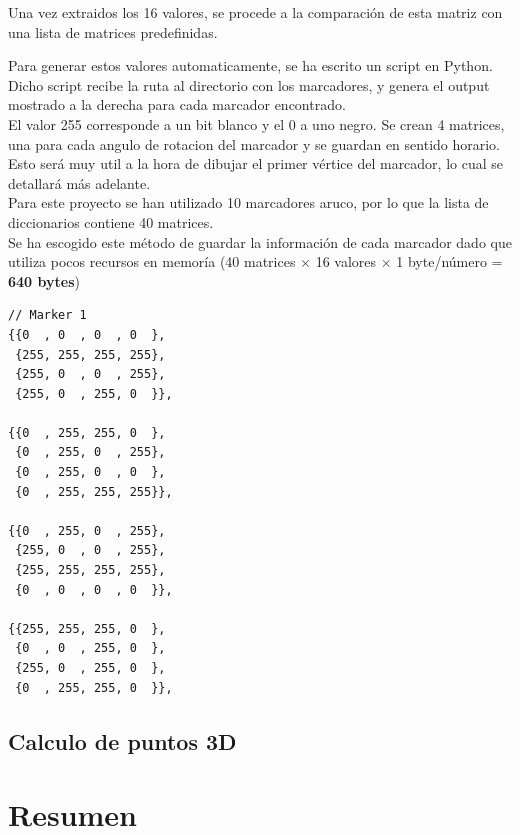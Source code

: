 \documentclass{article}
\begin{document}
Una vez extraidos los 16 valores, se procede a la comparación de esta matriz con una lista de matrices predefinidas.

\noindent
\begin{minipage}{0.6\textwidth}
  Para generar estos valores automaticamente, se ha escrito un script en Python.\\ Dicho script recibe la ruta al directorio con los marcadores, y genera el output mostrado a la derecha para cada marcador encontrado.\\

  El valor 255 corresponde a un bit blanco y el 0 a uno negro. Se crean 4 matrices, una para cada angulo de rotacion del marcador y se guardan en sentido horario. Esto será muy util a la hora de dibujar el primer vértice del marcador, lo cual se detallará más adelante.\\
  Para este proyecto se han utilizado 10 marcadores aruco, por lo que la lista de diccionarios contiene 40 matrices.\\

  Se ha escogido este método de guardar la información de cada marcador dado que utiliza pocos recursos en memoría (40 matrices $\times$ 16 valores $\times$ 1 byte/número = \textbf{640 bytes})
\end{minipage}%
\hfill
\begin{minipage}{0.35\textwidth}
\begin{center}
\begin{BVerbatim}
// Marker 1
{{0  , 0  , 0  , 0  }, 
 {255, 255, 255, 255}, 
 {255, 0  , 0  , 255}, 
 {255, 0  , 255, 0  }},
                       
{{0  , 255, 255, 0  }, 
 {0  , 255, 0  , 255}, 
 {0  , 255, 0  , 0  }, 
 {0  , 255, 255, 255}},

{{0  , 255, 0  , 255},
 {255, 0  , 0  , 255},
 {255, 255, 255, 255},
 {0  , 0  , 0  , 0  }},

{{255, 255, 255, 0  },
 {0  , 0  , 255, 0  },
 {255, 0  , 255, 0  },
 {0  , 255, 255, 0  }},
\end{BVerbatim}
\end{center}
\end{minipage}


\subsection{Calculo de puntos 3D}

\section{Resumen}
\end{document}
